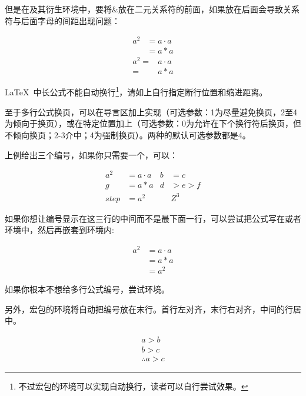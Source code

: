 但是在及其衍生环境中，要将\&放在二元关系符的前面，如果放在后面会导致关系符与后面字母的间距出现问题：

\begin{codeshow}
\begin{align*}
  a^2   &= a\cdot a \\
        &= a*a      
\end{align*}
\begin{align*}
  a^2   =& a\cdot a \\
        =& a*a      
\end{align*}
\end{codeshow}

\LaTeX\ 中长公式不能自动换行\footnote{不过宏包的环境可以实现自动换行，读者可以自行尝试效果。}，请如上自行指定断行位置和缩进距离。

至于多行公式换页，可以在导言区加上实现（可选参数：1为尽量避免换页，2至4为倾向于换页），或在特定位置加上（可选参数：0为允许在下个换行符后换页，但不倾向换页；2-3介中；4为强制换页）。两种的默认可选参数都是4。

上例给出三个编号，如果你只需要一个，可以：

\begin{codeshow}
\begin{align}
  a^2&= a\cdot a& b&=c\nonumber\\
  g  &= a*a & d&>e>f  \nonumber\\
  step&= a^2 & &Z^3
\end{align}
\end{codeshow}

如果你想让编号显示在这三行的中间而不是最下面一行，可以尝试把公式写在或者环境中，然后再嵌套到环境内:

\begin{codeshow}
\begin{equation}
  \begin{aligned}
    a^2  &= a\cdot a \\
         &= a*a      \\
         &= a^2
  \end{aligned}
\end{equation}
\end{codeshow}

如果你根本不想给多行公式编号，尝试环境。

另外，宏包的环境将自动把编号放在末行。首行左对齐，末行右对齐，中间的行居中。
\begin{codeshow}
\begin{multline}
a>b \\
b>c \\
\therefore a>c
\end{multline}
\end{codeshow}

